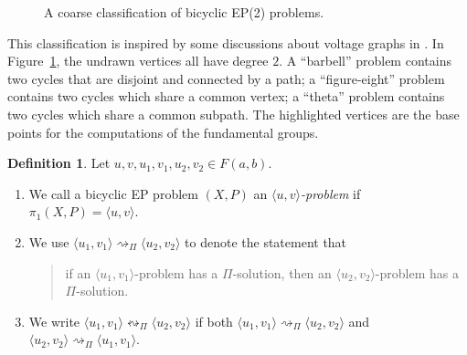 \documentclass[11pt]{amsart}
\theoremstyle{definition}
\newtheorem{definition}[theorem]{Definition}
\theoremstyle{definition}
\numberwithin{equation}{section}
\begin{document}
\begin{figure}[htbp]
\centering
\caption{\label{fig:BEP2} A coarse classification of bicyclic EP(2) problems.}
\end{figure}
This classification is inspired by some discussions about voltage graphs in \cite{GTBook}. In Figure~\ref{fig:BEP2}, the undrawn vertices all have degree $2$. A ``barbell'' problem contains two cycles that are disjoint and connected by a path; a ``figure-eight'' problem contains two cycles which share a common vertex; a ``theta'' problem contains two cycles which share a common subpath. The highlighted vertices are the base points for the computations of the fundamental groups. 

\begin{definition} Let $u, v, u_1, v_1, u_2, v_2\in F(a, b)$. 
\begin{enumerate}
\item[(1)] We call a bicyclic EP problem $(X, P)$ an {\em $\langle u, v\rangle$-problem} if $\pi_1(X, P)=\langle u, v\rangle$.
\item[(2)] We use $\langle u_1, v_1\rangle\rightsquigarrow_{\Pi}\langle u_2, v_2\rangle$ to denote the statement that 
\begin{quote}
if an $\langle u_1, v_1\rangle$-problem has a $\Pi$-solution, then an $\langle u_2, v_2\rangle$-problem has a $\Pi$-solution.
\end{quote}
\item[(3)] We write $\langle u_1, v_1\rangle\leftrightsquigarrow_{\Pi} \langle u_2, v_2\rangle$ if both $\langle u_1, v_1\rangle\rightsquigarrow_{\Pi} \langle u_2, v_2\rangle$ and $\langle u_2, v_2\rangle\rightsquigarrow_{\Pi} \langle u_1, v_1\rangle$.
\end{enumerate}
\end{definition}
\end{document}
